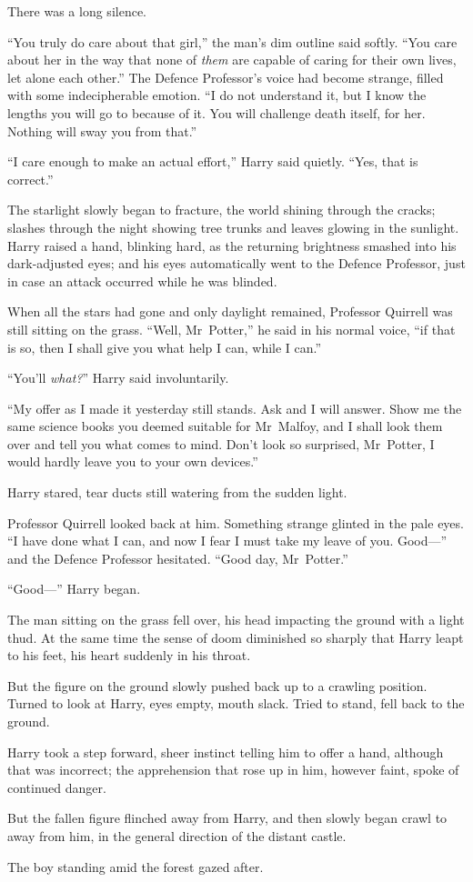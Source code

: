 There was a long silence.

“You truly do care about that girl,” the man’s dim outline said softly. “You care about her in the way that none of \emph{them} are capable of caring for their own lives, let alone each other.” The Defence Professor’s voice had become strange, filled with some indecipherable emotion. “I do not understand it, but I know the lengths you will go to because of it. You will challenge death itself, for her. Nothing will sway you from that.”

“I care enough to make an actual effort,” Harry said quietly. “Yes, that is correct.”

The starlight slowly began to fracture, the world shining through the cracks; slashes through the night showing tree trunks and leaves glowing in the sunlight. Harry raised a hand, blinking hard, as the returning brightness smashed into his dark-adjusted eyes; and his eyes automatically went to the Defence Professor, just in case an attack occurred while he was blinded.

When all the stars had gone and only daylight remained, Professor Quirrell was still sitting on the grass. “Well, Mr~Potter,” he said in his normal voice, “if that is so, then I shall give you what help I can, while I can.”

“You’ll \emph{what?}” Harry said involuntarily.

“My offer as I made it yesterday still stands. Ask and I will answer. Show me the same science books you deemed suitable for Mr~Malfoy, and I shall look them over and tell you what comes to mind. Don’t look so surprised, Mr~Potter, I would hardly leave you to your own devices.”

Harry stared, tear ducts still watering from the sudden light.

Professor Quirrell looked back at him. Something strange glinted in the pale eyes. “I have done what I can, and now I fear I must take my leave of you. Good—” and the Defence Professor hesitated. “Good day, Mr~Potter.”

“Good—” Harry began.

The man sitting on the grass fell over, his head impacting the ground with a light thud. At the same time the sense of doom diminished so sharply that Harry leapt to his feet, his heart suddenly in his throat.

But the figure on the ground slowly pushed back up to a crawling position. Turned to look at Harry, eyes empty, mouth slack. Tried to stand, fell back to the ground.

Harry took a step forward, sheer instinct telling him to offer a hand, although that was incorrect; the apprehension that rose up in him, however faint, spoke of continued danger.

But the fallen figure flinched away from Harry, and then slowly began crawl to away from him, in the general direction of the distant castle.

The boy standing amid the forest gazed after.

